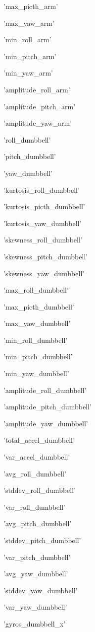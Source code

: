 \documentclass{article}
\begin{document}
\begin{enumerate*}
\item 'max\_picth\_arm'
\item 'max\_yaw\_arm'
\item 'min\_roll\_arm'
\item 'min\_pitch\_arm'
\item 'min\_yaw\_arm'
\item 'amplitude\_roll\_arm'
\item 'amplitude\_pitch\_arm'
\item 'amplitude\_yaw\_arm'
\item 'roll\_dumbbell'
\item 'pitch\_dumbbell'
\item 'yaw\_dumbbell'
\item 'kurtosis\_roll\_dumbbell'
\item 'kurtosis\_picth\_dumbbell'
\item 'kurtosis\_yaw\_dumbbell'
\item 'skewness\_roll\_dumbbell'
\item 'skewness\_pitch\_dumbbell'
\item 'skewness\_yaw\_dumbbell'
\item 'max\_roll\_dumbbell'
\item 'max\_picth\_dumbbell'
\item 'max\_yaw\_dumbbell'
\item 'min\_roll\_dumbbell'
\item 'min\_pitch\_dumbbell'
\item 'min\_yaw\_dumbbell'
\item 'amplitude\_roll\_dumbbell'
\item 'amplitude\_pitch\_dumbbell'
\item 'amplitude\_yaw\_dumbbell'
\item 'total\_accel\_dumbbell'
\item 'var\_accel\_dumbbell'
\item 'avg\_roll\_dumbbell'
\item 'stddev\_roll\_dumbbell'
\item 'var\_roll\_dumbbell'
\item 'avg\_pitch\_dumbbell'
\item 'stddev\_pitch\_dumbbell'
\item 'var\_pitch\_dumbbell'
\item 'avg\_yaw\_dumbbell'
\item 'stddev\_yaw\_dumbbell'
\item 'var\_yaw\_dumbbell'
\item 'gyros\_dumbbell\_x'

\end{enumerate*}
\end{document}
